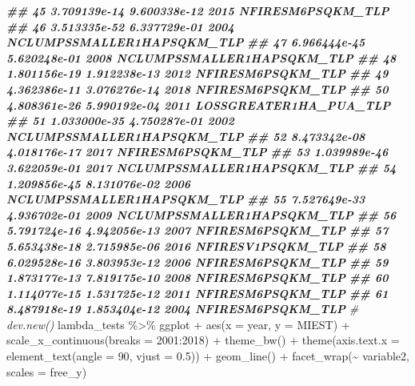 \documentclass[10pt,landscape,a3paper]{article}
\newenvironment{Shaded}{\begin{snugshade}}{\end{snugshade}}
\newcommand{\AttributeTok}[1]{\textcolor[rgb]{0.77,0.63,0.00}{#1}}
\newcommand{\CommentTok}[1]{\textcolor[rgb]{0.56,0.35,0.01}{\textit{#1}}}
\newcommand{\DecValTok}[1]{\textcolor[rgb]{0.00,0.00,0.81}{#1}}
\newcommand{\DocumentationTok}[1]{\textcolor[rgb]{0.56,0.35,0.01}{\textbf{\textit{#1}}}}
\newcommand{\FloatTok}[1]{\textcolor[rgb]{0.00,0.00,0.81}{#1}}
\newcommand{\FunctionTok}[1]{\textcolor[rgb]{0.00,0.00,0.00}{#1}}
\newcommand{\NormalTok}[1]{#1}
\newcommand{\SpecialCharTok}[1]{\textcolor[rgb]{0.00,0.00,0.00}{#1}}
\newcommand{\StringTok}[1]{\textcolor[rgb]{0.31,0.60,0.02}{#1}}
\begin{document}
\begin{Shaded}
\begin{Highlighting}[]
\DocumentationTok{\#\# 45 3.709139e{-}14 9.600338e{-}12 2015          NFIRESM6PSQKM\_TLP}
\DocumentationTok{\#\# 46 3.513335e{-}52 6.337729e{-}01 2004 NCLUMPSSMALLER1HAPSQKM\_TLP}
\DocumentationTok{\#\# 47 6.966444e{-}45 5.620248e{-}01 2008 NCLUMPSSMALLER1HAPSQKM\_TLP}
\DocumentationTok{\#\# 48 1.801156e{-}19 1.912238e{-}13 2012          NFIRESM6PSQKM\_TLP}
\DocumentationTok{\#\# 49 4.362386e{-}11 3.076276e{-}14 2018          NFIRESM6PSQKM\_TLP}
\DocumentationTok{\#\# 50 4.808361e{-}26 5.990192e{-}04 2011     LOSSGREATER1HA\_PUA\_TLP}
\DocumentationTok{\#\# 51 1.033000e{-}35 4.750287e{-}01 2002 NCLUMPSSMALLER1HAPSQKM\_TLP}
\DocumentationTok{\#\# 52 8.473342e{-}08 4.018176e{-}17 2017          NFIRESM6PSQKM\_TLP}
\DocumentationTok{\#\# 53 1.039989e{-}46 3.622059e{-}01 2017 NCLUMPSSMALLER1HAPSQKM\_TLP}
\DocumentationTok{\#\# 54 1.209856e{-}45 8.131076e{-}02 2006 NCLUMPSSMALLER1HAPSQKM\_TLP}
\DocumentationTok{\#\# 55 7.527649e{-}33 4.936702e{-}01 2009 NCLUMPSSMALLER1HAPSQKM\_TLP}
\DocumentationTok{\#\# 56 5.791724e{-}16 4.942056e{-}13 2007          NFIRESM6PSQKM\_TLP}
\DocumentationTok{\#\# 57 5.653438e{-}18 2.715985e{-}06 2016          NFIRESV1PSQKM\_TLP}
\DocumentationTok{\#\# 58 6.029528e{-}16 3.803953e{-}12 2006          NFIRESM6PSQKM\_TLP}
\DocumentationTok{\#\# 59 1.873177e{-}13 7.819175e{-}10 2008          NFIRESM6PSQKM\_TLP}
\DocumentationTok{\#\# 60 1.114077e{-}15 1.531725e{-}12 2011          NFIRESM6PSQKM\_TLP}
\DocumentationTok{\#\# 61 8.487918e{-}19 1.853404e{-}12 2004          NFIRESM6PSQKM\_TLP}
\CommentTok{\# dev.new()}
\NormalTok{lambda\_tests }\SpecialCharTok{\%\textgreater{}\%}
\NormalTok{  ggplot }\SpecialCharTok{+} \FunctionTok{aes}\NormalTok{(}\AttributeTok{x =}\NormalTok{ year, }\AttributeTok{y =}\NormalTok{ MIEST) }\SpecialCharTok{+}
  \FunctionTok{scale\_x\_continuous}\NormalTok{(}\AttributeTok{breaks =} \DecValTok{2001}\SpecialCharTok{:}\DecValTok{2018}\NormalTok{) }\SpecialCharTok{+} 
  \FunctionTok{theme\_bw}\NormalTok{() }\SpecialCharTok{+}
  \FunctionTok{theme}\NormalTok{(}\AttributeTok{axis.text.x =} \FunctionTok{element\_text}\NormalTok{(}\AttributeTok{angle =} \DecValTok{90}\NormalTok{, }\AttributeTok{vjust =} \FloatTok{0.5}\NormalTok{)) }\SpecialCharTok{+}
  \FunctionTok{geom\_line}\NormalTok{() }\SpecialCharTok{+} \FunctionTok{facet\_wrap}\NormalTok{(}\SpecialCharTok{\textasciitilde{}}\NormalTok{ variable2, }\AttributeTok{scales =} \StringTok{\textquotesingle{}free\_y\textquotesingle{}}\NormalTok{)}
\end{Highlighting}
\end{Shaded}
\end{document}
